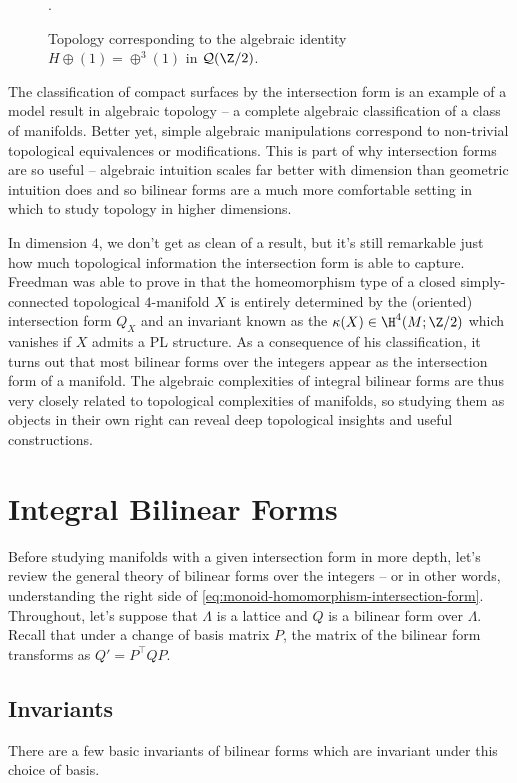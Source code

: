\begin{figure}
	\centering
	\medskip
	\caption{Topology corresponding to the algebraic identity $H\oplus (1)=\oplus^3 (1)$ in $\mathcal{Q}(\Z/2)$.}\label{fig:compact-surfaces-intersection-form-identity}.
\end{figure}

The classification of compact surfaces by the intersection form is an example of a model result in algebraic topology -- a complete algebraic classification of a class of manifolds. Better yet, simple algebraic manipulations correspond to non-trivial topological equivalences or modifications. This is part of why intersection forms are so useful -- algebraic intuition scales far better with dimension than geometric intuition does and so bilinear forms are a much more comfortable setting in which to study topology in higher dimensions.

In dimension $4$, we don't get as clean of a result, but it's still remarkable just how much topological information the intersection form is able to capture. Freedman was able to prove in \cite{freedman1982} that the homeomorphism type of a closed simply-connected topological $4$-manifold $X$ is entirely determined by the (oriented) intersection form $Q_X$ and an invariant known as the  $\kappa(X)\in \H^4(M;\Z/2)$ which vanishes if $X$ admits a PL structure. As a consequence of his classification, it turns out that most bilinear forms over the integers appear as the intersection form of a manifold.
The algebraic complexities of integral bilinear forms are thus very closely related to topological complexities of manifolds, so studying them as objects in their own right can reveal deep topological insights and useful constructions.

\section{Integral Bilinear Forms}\label{sec:integral-bilinear-forms}
Before studying manifolds with a given intersection form in more depth, let's review the general theory of bilinear forms over the integers -- or in other words, understanding the right side of \cref{eq:monoid-homomorphism-intersection-form}. 
Throughout, let's suppose that $\Lambda$ is a lattice and $Q$ is a bilinear form over $\Lambda$. Recall that under a change of basis matrix $P$, the matrix of the bilinear form transforms as $Q'= P^\intercal QP$.

\subsection{Invariants}\label{sec:integral-bilinear-forms-invariants}
There are a few basic invariants of bilinear forms which are invariant under this choice of basis.


